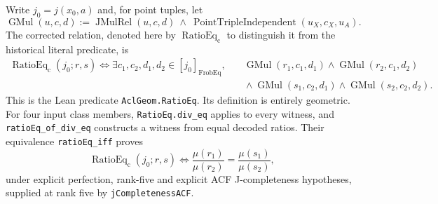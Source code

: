 \documentclass[11pt,oneside]{article}
\theoremstyle{definition}
\theoremstyle{remark}
\newcommand{\lean}[1]{\nolinkurl{#1}}
\begin{document}
Write $j_0=j(x_0,a)$ and, for point tuples, let
\[
 \operatorname{GMul}(u,c,d):=
 \operatorname{JMulRel}(u,c,d)\ \land\
 \operatorname{PointTripleIndependent}(u_X,c_X,u_A).
\]
The corrected relation, denoted here by $\operatorname{RatioEq}_{\mathrm c}$ to
distinguish it from the historical literal predicate, is
\[
\begin{split}
 \operatorname{RatioEq}_{\mathrm c}(j_0;r,s)
 \Longleftrightarrow \exists c_1,c_2,d_1,d_2\in[j_0]_{\operatorname{FrobEq}},\quad&
 \operatorname{GMul}(r_1,c_1,d_1)\land
 \operatorname{GMul}(r_2,c_1,d_2)\\
 &{}\land\operatorname{GMul}(s_1,c_2,d_1)\land
 \operatorname{GMul}(s_2,c_2,d_2).
\end{split}
\]
This is the Lean predicate \lean{AclGeom.RatioEq}. Its definition is entirely
geometric. For four input class members, \lean{RatioEq.div_eq} applies to every
witness, and \lean{ratioEq_of_div_eq} constructs a witness from equal decoded
ratios. Their equivalence \lean{ratioEq_iff} proves
\[
 \operatorname{RatioEq}_{\mathrm c}(j_0;r,s)
 \Longleftrightarrow \frac{\mu(r_1)}{\mu(r_2)}
                     =\frac{\mu(s_1)}{\mu(s_2)},
\]
under explicit perfection, rank-five and explicit ACF J-completeness hypotheses, supplied at rank five by
\lean{jCompletenessACF}.
\end{document}
